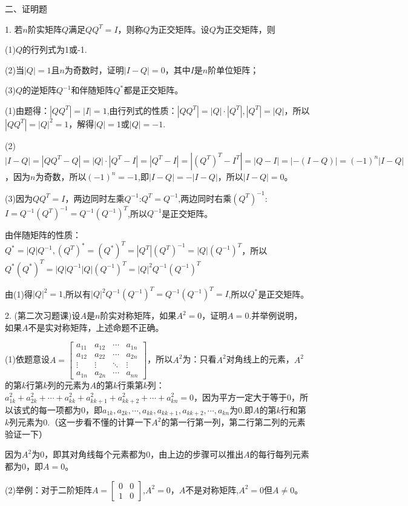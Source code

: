 \documentclass{article}
\begin{document}
二、证明题

1. 若$n$阶实矩阵$Q$满足$QQ^{T}=I$，则称$Q$为正交矩阵。设$Q$为正交矩阵，则

(1)$Q$的行列式为1或-1.

(2)当$|Q|=1$且$n$为奇数时，证明$|I-Q|=0$，其中$I$是$n$阶单位矩阵；

(3)$Q$的逆矩阵$Q^{-1}$和伴随矩阵$Q^{*}$都是正交矩阵。

\begin{zhengming}
(1)由题得：$|QQ^{T}|=|I|=1$,由行列式的性质：$|QQ^{T}|=|Q|\cdot|Q^T|,|Q^T|=|Q|$，所以$|QQ^{T}|=|Q|^2=1$，解得$|Q|=1$或$|Q|=-1$.

(2)$|I-Q|=|QQ^{T}-Q|=|Q|\cdot|Q^T-I|=|Q^T-I|=|(Q^T)^T-I^T|=|Q-I|=|-(I-Q)|=(-1)^{n}|I-Q|$，因为$n$为奇数，所以$(-1)^n=-1$,即$|I-Q|=-|I-Q|$，所以$|I-
Q|=0$。

(3)因为$QQ^{T}=I$，两边同时左乘$Q^{-1}$:$Q^{T}=Q^{-1}$,两边同时右乘$(Q^{T})^{-1}$:$I=Q^{-1}(Q^{T})^{-1}=Q^{-1}(Q^{-1})^{T}$,所以$Q^{-1}$是正交矩阵。

由伴随矩阵的性质：$Q^*=|Q|Q^{-1},(Q^T)^*=(Q^*)^T=|Q^T|(Q^{T})^{-1}=|Q|(Q^{-1})^{T}$，所以$Q^*(Q^*)^T=|Q|Q^{-1}|Q|(Q^{-1})^{T}=|Q|^{2}Q^{-1}(Q^{-1})^{T}$

由(1)得$|Q|^{2}=1$,所以有$|Q|^{2}Q^{-1}(Q^{-1})^{T}=Q^{-1}(Q^{-1})^{T}=I$,所以$Q^{*}$是正交矩阵。
\end{zhengming}

2. \textcolor[rgb]{0.50,0.00,0.00}{(第二次习题课)}设$A$是$n$阶实对称矩阵，如果$A^{2}=0$，证明$A=0$.并举例说明，如果$A$不是实对称矩阵，上述命题不正确。

\begin{zhengming}

(1)依题意设$A=
\begin{bmatrix}
  a_{11} & a_{12} & \cdots & a_{1n} \\
  a_{12} & a_{22} & \cdots & a_{2n} \\
  \vdots & \vdots & \ddots & \vdots \\
  a_{1n} & a_{2n} & \cdots & a_{nn}
\end{bmatrix}
$，所以$A^2$为：只看$A^2$对角线上的元素，$A^2$的第$k$行第$k$列的元素为$A$的第$k$行乘第$k$列：$a_{1k}^2+a_{2k}^2+\cdots+a_{kk}^2+a_{kk+1}^2+a_{kk+2}^2+\cdots+a_{kn}^2=0$，因为平方一定大于等于0，所以该式的每一项都为0，即$a_{1k},a_{2k},\cdots,a_{kk},a_{kk+1},a_{kk+2},\cdots,a_{kn}$为0.即$A$的第$k$行和第$k$列元素为0.\textcolor[rgb]{1.00,0.00,0.00}{（这一步看不懂的计算一下$A^2$的第一行第一列，第二行第二列的元素验证一下）}

因为$A^2$为0，即其对角线每个元素都为0，由上边的步骤可以推出$A$的每行每列元素都为0，即$A=0$。

(2)举例：对于二阶矩阵$
A=\begin{bmatrix}
0& 0\\
1& 0
\end{bmatrix}
$,$A^2=0$，$A$不是对称矩阵,$A^2=0$但$A\neq0$。
\end{zhengming}
\end{document}
